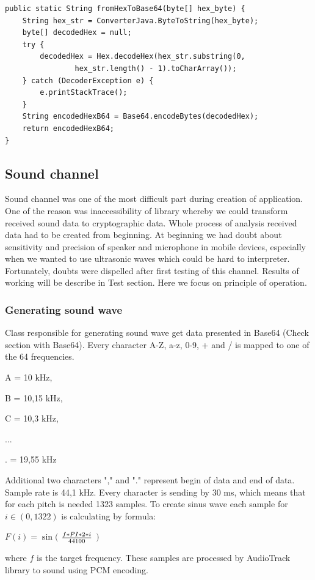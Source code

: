 \documentclass[11pt,titlepage]{article}
\theoremstyle{plain}
\begin{document}
\begin{lstlisting}[caption={Example of code converting from Hex String to Base64 String}]
public static String fromHexToBase64(byte[] hex_byte) {
	String hex_str = ConverterJava.ByteToString(hex_byte);
	byte[] decodedHex = null;
	try {
		decodedHex = Hex.decodeHex(hex_str.substring(0,
				hex_str.length() - 1).toCharArray());
	} catch (DecoderException e) {
		e.printStackTrace();
	}
	String encodedHexB64 = Base64.encodeBytes(decodedHex);
	return encodedHexB64;
}
\end{lstlisting}

\subsection{Sound channel}

Sound channel was one of the most difficult part during creation of application. One of the reason was inaccessibility of library whereby we could transform received sound data to cryptographic data. Whole process of analysis received data had to be created from beginning. At beginning we had doubt about sensitivity and precision of speaker and microphone in mobile devices, especially when we wanted to use ultrasonic waves which could be hard to interpreter. Fortunately, doubts were dispelled after first testing of this channel. Results of working will be describe in Test section. Here we focus on principle of operation.

\subsubsection{Generating sound wave}

Class responsible for generating sound wave get data presented in Base64 (Check section with Base64). Every character A-Z, a-z, 0-9, + and / is mapped to one of the 64 frequencies.

A = 10 kHz,

B = 10,15 kHz,

C = 10,3 kHz,

...

. = 19,55 kHz


Additional two characters "," and "." represent begin of data and end of data. Sample rate is 44,1 kHz. Every character is sending by 30 ms, which means that for each pitch is needed 1323 samples. To create sinus wave each sample for $ i \in (0,1322) $ is calculating by formula:
\begin{center}
$F(i) = \sin($ $f \ast PI \ast 2 \ast i  \over 44 100 $ $)$
\end{center}
where $f$ is the target frequency.
These samples are processed by AudioTrack library to sound using PCM encoding. 
\end{document}
